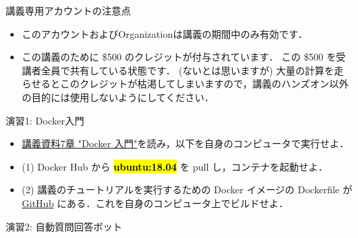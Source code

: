 \documentclass[unicode,11pt]{beamer}
\begin{document}
\begin{frame}{講義専用アカウントの注意点}

\begin{itemize}
    \item このアカウントおよびOrganizationは講義の期間中のみ有効です．
    \item この講義のために \$500 のクレジットが付与されています．
    この \$500 を受講者全員で共有している状態です．
    (ないとは思いますが) 大量の計算を走らせるとこのクレジットが枯渇してしまいますので，講義のハンズオン以外の目的には使用しないようにしてください．
\end{itemize}

\end{frame}

\begin{frame}{演習1: Docker入門}

\begin{itemize}
    \item \href{https://tomomano.github.io/learn-aws-by-coding/\#sec_docker_introduction}{講義資料7章 "Docker 入門"}を読み，以下を自身のコンピュータで実行せよ．
    \item (1) Docker Hub から \hl{\textbf{ubuntu:18.04}} を pull し，コンテナを起動せよ．
    \item (2) 講義のチュートリアルを実行するための Docker イメージの Dockerfile が \href{https://github.com/tomomano/learn-aws-by-coding/blob/main/docker/Dockerfile}{GitHub} にある．これを自身のコンピュータ上でビルドせよ．
\end{itemize}

\end{frame}

\begin{frame}{演習2: 自動質問回答ボット}


\end{frame}
\end{document}
